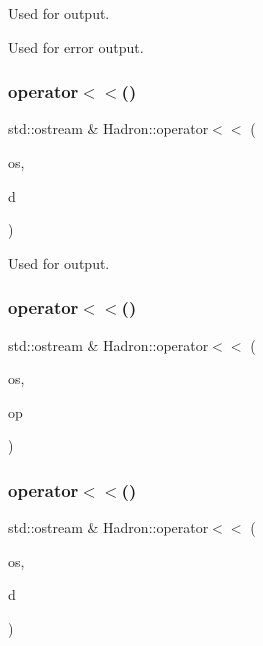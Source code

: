 Used for output. 

Used for error output. \mbox{\label{namespaceHadron_ae2a5c7a5ffdda238337fd194679743a6}} 
\subsubsection{\texorpdfstring{operator$<$$<$()}{operator<<()}\hspace{0.1cm}{\footnotesize\ttfamily [2/48]}}
{\footnotesize\ttfamily std\+::ostream \& Hadron\+::operator$<$$<$ (\begin{DoxyParamCaption}\item[{std\+::ostream \&}]{os,  }\item[{const \mbox{\hyperlink{structHadron_1_1HadronNptType__t}{Hadron\+Npt\+Type\+\_\+t}} \&}]{d }\end{DoxyParamCaption})}



Used for output. 

\mbox{\label{namespaceHadron_a7351a4ec8398497cfa72ae6326e7d88c}} 
\subsubsection{\texorpdfstring{operator$<$$<$()}{operator<<()}\hspace{0.1cm}{\footnotesize\ttfamily [3/48]}}
{\footnotesize\ttfamily std\+::ostream \& Hadron\+::operator$<$$<$ (\begin{DoxyParamCaption}\item[{std\+::ostream \&}]{os,  }\item[{const \mbox{\hyperlink{structHadron_1_1KeyCGCSU3__t}{Key\+C\+G\+C\+S\+U3\+\_\+t}} \&}]{op }\end{DoxyParamCaption})}

\mbox{\label{namespaceHadron_a684b751246f1b7f63d5feafa97160408}} 
\subsubsection{\texorpdfstring{operator$<$$<$()}{operator<<()}\hspace{0.1cm}{\footnotesize\ttfamily [4/48]}}
{\footnotesize\ttfamily std\+::ostream \& Hadron\+::operator$<$$<$ (\begin{DoxyParamCaption}\item[{std\+::ostream \&}]{os,  }\item[{const \mbox{\hyperlink{structHadron_1_1KeyHadronSUNNPartIrrep__t}{Key\+Hadron\+S\+U\+N\+N\+Part\+Irrep\+\_\+t}} \&}]{d }\end{DoxyParamCaption})}



